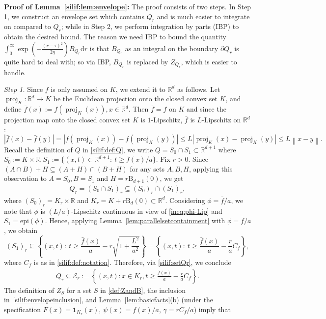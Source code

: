 \documentclass[11pt,letterpaper]{article}
\newcommand{\ball}{\mathrm{B}}
\newcommand{\R}{\mathbb{R}}
\newcommand{\norm}[1]{\left\lVert #1 \right\rVert}
\newcommand{\abs}[1]{\left\vert #1 \right\rvert}
\newcommand{\proj}{\operatorname{proj}}
\newcommand{\D}{\mathrm{d}}
\begin{document}
\medskip\textbf{Proof of Lemma~\ref{silif:lem:envelope}:}   The proof consists of two steps. In Step 1, we construct an envelope set which contains $Q_r$ and is much easier to integrate on compared to $Q_r$; while in Step 2, we perform integration by parts (IBP) to obtain the desired bound. The reason we need IBP to bound the quantity $\int_{0}^{\infty} \exp \left(-\frac{(r-\tau)^2}{2\eta}\right)  
B_{Q_r}  \D r$ is that $B_{Q_r}$ as an integral on the boundary $\partial Q_r$ is quite hard to deal with; so via IBP, $B_{Q_r}$ is replaced by $Z_{Q_r}$, which is easier to handle.  

\smallskip
\emph{Step 1.}
Since $f$ is only assumed on $K$, we extend it to $\R^d$ as follows.
Let $\proj_K:\R^d\to K$ be the Euclidean projection onto the closed convex set $K$,
and define $\bar f(x):=f(\proj_K(x)),x\in\R^d$. Then $\bar f=f$ on $K$ and since the projection map onto the closed convex set $K$ is $1$-Lipschitz, $\bar f$ is $L$-Lipschitz on $\R^d$: 
\begin{equation}\label{ineq:phi-Lip}
    \abs{\bar f(x)-\bar f(y)} = \abs{f(\proj_K(x))-f(\proj_K(y))}\leq  L\abs{\proj_K(x)-\proj_K(y)}\leq L\norm{x-y}. 
\end{equation}
Recall the definition of $Q$ in \eqref{silif:def:Q}, we write $Q=S_0\cap S_1 \subset \R^{d+1}$ where $S_0:=K\times \R, S_1:=\{(x,t)\in\R^{d+1}:\ t\ge \bar f(x)/a\}$. Fix $r>0$. Since $(A\cap B)+H\subseteq (A+H)\cap(B+H)$ for any sets $A,B,H$, applying this observation to $A=S_0,B=S_1$ and $H=r\ball_{d+1}(0)$, we get
\begin{align}
\label{silif:setQr}
Q_r=(S_0\cap S_1)_r \subseteq (S_0)_r\cap (S_1)_r,
\end{align}
where $(S_0)_r = K_r\times \R$ and $K_r=K+r\ball_d(0)\subset\R^d$.
Considering $\phi=\bar f/a$, we note that $\phi$ is $(L/a)$-Lipschitz continuous in view of \eqref{ineq:phi-Lip} and $S_1=\mathrm{epi}(\phi)$.
Hence, applying Lemma~\ref{lem:parallelsetcontainment} with $\phi=\bar f/a$, we obtain 
\[
(S_1)_r \subseteq \left\{(x,t):\ t\ge \frac{\bar f(x)}{a}-r\sqrt{1+\frac{L^2}{a^2}}\right\}=\left\{(x,t):\ t\ge \frac{\bar f(x)}{a}-\frac{r}{a}C_f\right\},
\]
where $C_f$ is as in \eqref{silif:def:notation}.
Therefore, via \eqref{silif:setQr}, we conclude 
\begin{align}
\label{silif:envelopeinclusion}
Q_r\subseteq \mathcal E_r:=\left\{(x,t):x\in K_r, t\ge \frac{\bar f(x)}{a}-\frac{r}{a}C_f \right\}.
\end{align}
The definition of $Z_S$ for a set $S$ in \eqref{def:ZandB}, the inclusion in~\eqref{silif:envelopeinclusion}, and Lemma~\ref{lem:basicfacts}(b) (under the specification $F(x)=\mathbf{1}_{K_r}(x)$, $\psi(x)=\bar f(x)/a$, $\gamma=rC_f/a$) imply that
\end{document}
